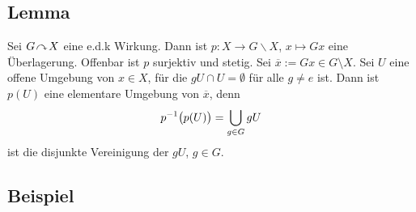 \subsection[Lemma: Eigentlich diskontinuierliche Wirkungen definieren Überlagerungen]{Lemma} %
\label{sub:12.2}
Sei $G \wirkung X$ eine e.d.k Wirkung. Dann ist $p : X \to G \backslash X$, $x \mapsto Gx$ eine Überlagerung.
Offenbar ist $p$ surjektiv und stetig. Sei $\overline{x} := G x \in G \setminus X $. Sei $U$ eine offene Umgebung von $x \in X$, für die $g U \cap U = \emptyset$ für alle $g \not= e$ ist. Dann ist $p(U)$ eine elementare Umgebung von $\overline{x}$, denn 
\[
	p ^{-1} \enbrace[\big]{p(U)} = \bigcup_{g \in G} g U
\]
ist die disjunkte Vereinigung der $g U$, $g \in G$. \bewende

\subsection[Beispiele für eigentlich diskontinuierliche Wirkungen]{Beispiel} %
\label{sub:12.3}
